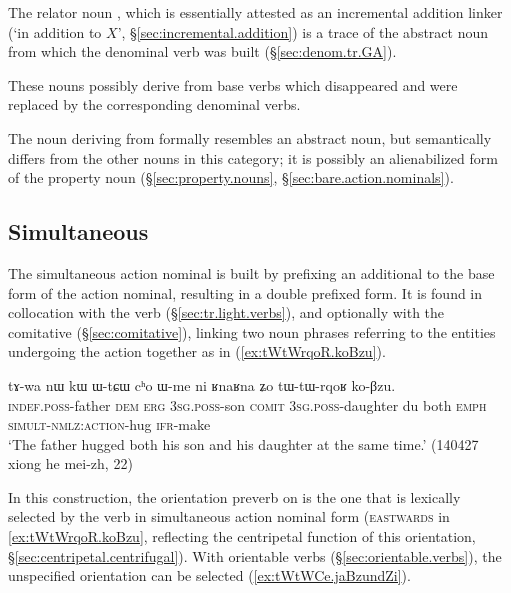 The relator noun , which is essentially attested as an incremental addition linker (`in addition to $X$', §\ref{sec:incremental.addition}) is a trace of the abstract noun from which the denominal verb  was built (§\ref{sec:denom.tr.GA}).

These nouns possibly derive from base verbs which disappeared and were replaced by the corresponding denominal verbs.

The noun  deriving from  formally resembles an abstract noun, but semantically differs from the other nouns in this category; it is possibly an alienabilized form of the property noun  (§\ref{sec:property.nouns}, §\ref{sec:bare.action.nominals}).

  

\subsection{Simultaneous} \label{sec:simultaneous.action.nominal}
The simultaneous action nominal is built by prefixing an additional  to the base form of the action nominal, resulting in a double  prefixed form. It is found in collocation with the verb  (§\ref{sec:tr.light.verbs}), and optionally with the comitative  (§\ref{sec:comitative}), linking two noun phrases referring to the entities undergoing the action together as in (\ref{ex:tWtWrqoR.koBzu}).


\begin{exe}
	\ex \label{ex:tWtWrqoR.koBzu}
	\gll tɤ-wa nɯ kɯ ɯ-tɕɯ cʰo ɯ-me ni ʁnaʁna ʑo tɯ-tɯ-rqoʁ ko-βzu. \\
	\textsc{indef}.\textsc{poss}-father \textsc{dem} \textsc{erg} \textsc{3sg}.\textsc{poss}-son \textsc{comit} \textsc{3sg}.\textsc{poss}-daughter du both \textsc{emph} \textsc{simult}-\textsc{nmlz}:\textsc{action}-hug \textsc{ifr}-make \\
	\glt `The father hugged both his son and his daughter at the same time.' (140427 xiong he mei-zh, 22)
 \end{exe}

In this construction, the orientation preverb on  is the one that is lexically selected by the verb in simultaneous action nominal form (\textsc{eastwards} in \ref{ex:tWtWrqoR.koBzu}, reflecting the centripetal function of this orientation, §\ref{sec:centripetal.centrifugal}). With orientable verbs (§\ref{sec:orientable.verbs}), the unspecified orientation   can be selected (\ref{ex:tWtWCe.jaBzundZi}). 
 
